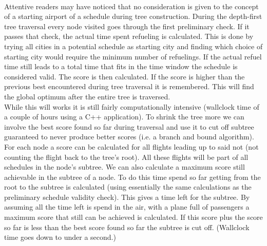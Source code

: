 \documentclass[journal]{IEEEtran}
\begin{document}
\\
Attentive readers may have noticed that no consideration is given to the concept of a starting airport of a schedule during tree construction. During the depth-first tree traversal every node visited goes through the first preliminary check. If it passes that check, the actual time spent refueling is calculated. This is done by trying all cities in a potential schedule as starting city and finding which choice of starting city would require the minimum number of refuelings. If the actual refuel time still leads to a total time that fits in the time window the schedule is considered valid. The score is then calculated. If the score is higher than the previous best encountered during tree traversal it is remembered. This will find the global optimum after the entire tree is traversed.\\
While this will works it is still fairly computationally intensive (wallclock time of a couple of hours using a C++ application). To shrink the tree more we can involve the best score found so far during traversal and use it to cut off subtree guaranteed to never produce better scores (i.e. a branch and bound algorithm). For each node a score can be calculated for all flights leading up to said not (not counting the flight back to the tree's root). All these flights will be part of all schedules in the node's subtree. We can also calculate a maximum score still achievable in the subtree of a node. To do this time spend so far getting from the root to the subtree is calculated (using essentially the same calculations as the preliminary schedule validity check). This gives a time left for the subtree. By assuming all the time left is spend in the air, with a plane full of passengers a maximum score that still can be achieved is calculated. If this score plus the score so far is less than the best score found so far the subtree is cut off. (Wallclock time goes down to under a second.)
\end{document}
